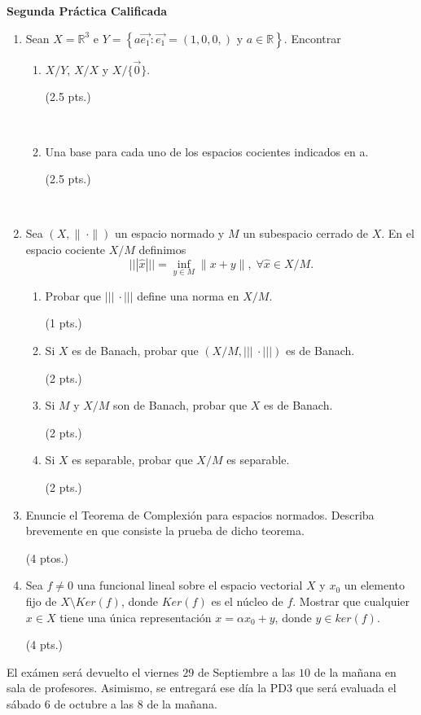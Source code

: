 \documentclass[12pt]{report}
\begin{document}
\begin{center}
\textbf{Segunda Pr\'actica Calificada}\\
\end{center}
\begin{enumerate}
\item Sean $X=\mathbb{R}^3$ e $Y=\left\lbrace a\vec{e_1} : \vec{e_1}=(1,0,0,) \text{ y } a\in\mathbb{R}\right\rbrace.$ Encontrar 
\begin{enumerate}
\item $X/Y$, $X/X$ y $X/\{\vec{0}\}.$\parbox[b][0cm][c]{13.5cm}{\raggedleft (2.5 pts.)}\\ 
\item Una base para cada uno de los espacios cocientes indicados en a.\parbox[b][0cm][c]{5.5cm}{\raggedleft(2.5 pts.)}\\
\end{enumerate}
\item Sea $(X,\|\:\cdotp\|)$ un espacio normado y $M$ un subespacio cerrado de $X$. En el espacio cociente $X/M$ definimos $$|||\hat{x}|||=\inf_{y\in M}\|x+y\|,\; \forall\hat{x}\in X/M.$$
\begin{enumerate}
\item Probar que $|||\:\cdotp|||$ define una norma en $X/M$.\parbox[b][0cm][c]{9.0cm}{\raggedleft{} (1 pts.)}
\item Si $X$ es de Banach, probar que $(X/M,|||\:\cdotp|||)$ es de Banach. 			\parbox[b][0cm][c]{6.5cm}{\raggedleft(2 pts.)}
\item Si $M$ y $X/M$ son de Banach, probar que $X$ es de Banach. \parbox[b][0cm][c]{6.5cm}{\raggedleft(2 pts.)}
\item Si $X$ es separable, probar que $X/M$ es separable. \parbox[b][0cm][c]{8cm}{\raggedleft(2 pts.)}
\end{enumerate}
\item Enuncie el Teorema de Complexi\'on para espacios normados. Describa brevemente en que consiste la prueba de dicho teorema. \parbox[b][0cm][c]{13cm}{\raggedleft(4 ptos.)}
\item Sea $f\neq 0$ una funcional lineal sobre el espacio vectorial $X$ y $x_0$ un elemento fijo de $X\setminus Ker(f)$, donde $Ker(f)$ es el n\'ucleo de $f$. Mostrar que cualquier $x\in X$ tiene una \'unica representaci\'on $x=\alpha x_0+y$, donde $y\in ker(f).$\parbox[b][0cm][c]{14.5cm}{\raggedleft(4 pts.)}
\end{enumerate}
El ex\'amen ser\'a devuelto el viernes $29$ de Septiembre a las $10$ de la ma\~nana en sala de profesores. Asimismo, se entregar\'a ese d\'ia la PD3 que ser\'a evaluada el s\'abado $6$ de octubre a las $8$ de la ma\~nana.
\end{document}
